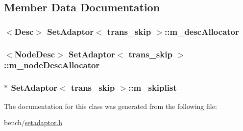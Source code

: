 \subsection{Member Data Documentation}
\hypertarget{classSetAdaptor_3_01trans__skip_01_4_ab1c58ed44975068b73118468a7ae56b2}{
\subsubsection[{m\-\_\-desc\-Allocator}]{$<${\bf Desc}$>$ {\bf Set\-Adaptor}$<$ {\bf trans\-\_\-skip} $>$\-::m\-\_\-desc\-Allocator\hspace{0.3cm}{\ttfamily [private]}}}\label{classSetAdaptor_3_01trans__skip_01_4_ab1c58ed44975068b73118468a7ae56b2}
\hypertarget{classSetAdaptor_3_01trans__skip_01_4_a6011fb7888ade074791329b0ef855429}{
\subsubsection[{m\-\_\-node\-Desc\-Allocator}]{$<${\bf Node\-Desc}$>$ {\bf Set\-Adaptor}$<$ {\bf trans\-\_\-skip} $>$\-::m\-\_\-node\-Desc\-Allocator\hspace{0.3cm}{\ttfamily [private]}}}\label{classSetAdaptor_3_01trans__skip_01_4_a6011fb7888ade074791329b0ef855429}
\hypertarget{classSetAdaptor_3_01trans__skip_01_4_a35f19b9f0f48406537a0c224be5a3c67}{
\subsubsection[{m\-\_\-skiplist}]{$\ast$ {\bf Set\-Adaptor}$<$ {\bf trans\-\_\-skip} $>$\-::m\-\_\-skiplist\hspace{0.3cm}{\ttfamily [private]}}}\label{classSetAdaptor_3_01trans__skip_01_4_a35f19b9f0f48406537a0c224be5a3c67}


The documentation for this class was generated from the following file\-:\begin{DoxyCompactItemize}
\item 
bench/\hyperlink{setadaptor_8h}{setadaptor.\-h}\end{DoxyCompactItemize}
